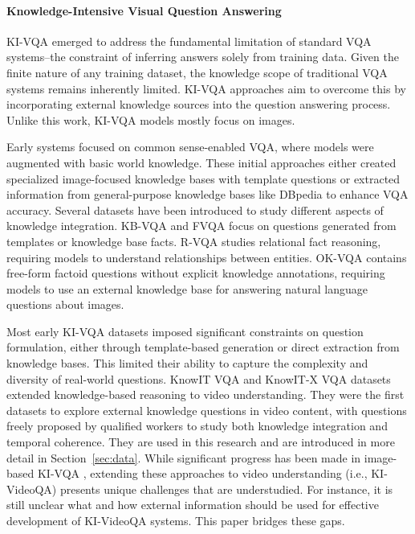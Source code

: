 \paragraph{\textbf{Knowledge-Intensive Visual Question Answering}}
KI-VQA emerged to address the fundamental limitation of standard VQA systems--the constraint of inferring answers solely from training data. Given the finite nature of any training dataset, the knowledge scope of traditional VQA systems remains inherently limited. KI-VQA approaches aim to overcome this by incorporating external knowledge sources into the question answering process. Unlike this work, KI-VQA models mostly focus on images.

Early systems focused on common sense-enabled VQA, where models were augmented with basic world knowledge. These initial approaches either created specialized image-focused knowledge bases with template questions \cite{zhu2015building} or extracted information from general-purpose knowledge bases like DBpedia \cite{wu2016ask, auer2007dbpedia} to enhance VQA accuracy.
Several datasets have been introduced to study different aspects of knowledge integration.  KB-VQA \cite{wang2015explicit} and FVQA \cite{wang2017fvqa} focus on questions generated from templates or knowledge base facts. R-VQA \cite{lu2018r} studies relational fact reasoning, requiring models to understand relationships between entities. OK-VQA \cite{marino2019ok} contains free-form factoid questions without explicit knowledge annotations, requiring models to use an external knowledge base for answering natural language questions about images.

Most early KI-VQA datasets imposed significant constraints on question formulation, either through template-based generation or direct extraction from knowledge bases. This limited their ability to capture the complexity and diversity of real-world questions. KnowIT VQA \cite{garcia2020knowit} and KnowIT-X VQA \cite{wu2021transferring} datasets extended knowledge-based reasoning to video understanding. They were the first datasets to explore external knowledge questions in video content, with questions freely proposed by qualified workers to study both knowledge integration and temporal coherence. They are used in this research and are introduced in more detail in Section~\ref{sec:data}. While significant progress has been made in image-based KI-VQA \cite{Qu2021KIVQA,Salemi2023ICTIR,Salemi2023MMFID,mavex,krisp,kat,unifer}, extending these approaches to video understanding (i.e., KI-VideoQA) presents unique challenges that are understudied. For instance, it is still unclear what and how external information should be used for effective development of KI-VideoQA systems. This paper bridges these gaps.